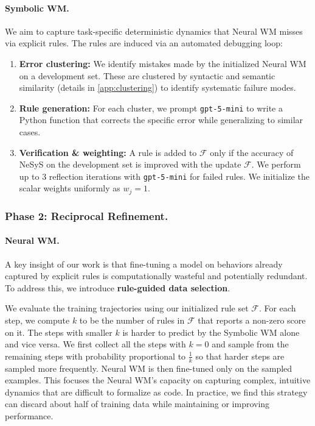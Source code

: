 \documentclass{article}
\theoremstyle{plain}
\theoremstyle{definition}
\theoremstyle{remark}
\newcommand{\ours}{{\sc NeSyS}\xspace}
\begin{document}
\paragraph{Symbolic WM.}
We aim to capture task-specific deterministic dynamics that Neural WM misses via explicit rules. The rules are induced via an automated debugging loop:
\begin{enumerate}
\item \textbf{Error clustering:} We identify mistakes made by the initialized Neural WM on a development set. These are clustered by syntactic and semantic similarity (details in \cref{app:clustering}) to identify systematic failure modes.
\item \textbf{Rule generation:} For each cluster, we prompt \texttt{gpt-5-mini} to write a Python function that corrects the specific error while generalizing to similar cases.
\item \textbf{Verification \& weighting:} A rule is added to $\mathcal{F}$ only if the accuracy of \ours on the development set is improved with the update $\mathcal{F}$. We perform up to 3 reflection iterations with \texttt{gpt-5-mini} for failed rules. We initialize the scalar weights uniformly as $w_j=1$.
\end{enumerate}

\subsubsection{Phase 2: Reciprocal Refinement.}
\paragraph{Neural WM.}
A key insight of our work is that fine-tuning a model on behaviors already captured by explicit rules is computationally wasteful and potentially redundant. To address this, we introduce \textbf{rule-guided data selection}. 

We evaluate the training trajectories using our initialized rule set $\mathcal{F}$. For each step, we compute $k$ to be the number of rules in $\mathcal{F}$ that reports a non-zero score on it. The steps with smaller $k$ is harder to predict by the Symbolic WM alone and vice versa. We first collect all the steps with $k=0$ and sample from the remaining steps with probability proportional to $\frac{1}{k}$ so that harder steps are sampled more frequently. Neural WM is then fine-tuned only on the sampled examples. This focuses the Neural WM's capacity on capturing complex, intuitive dynamics that are difficult to formalize as code. In practice, we find this strategy can discard about half of training data while maintaining or improving performance.
\end{document}
